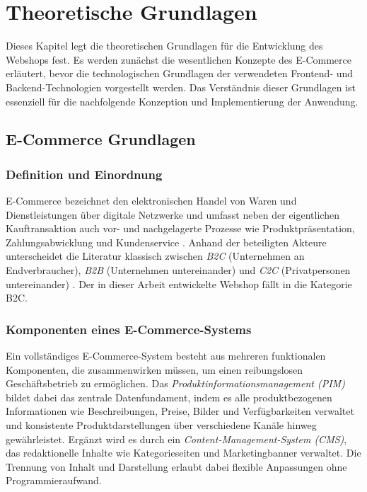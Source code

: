 \chapter{Theoretische Grundlagen}
\label{ch:grundlagen}

Dieses Kapitel legt die theoretischen Grundlagen für die Entwicklung des Webshops fest. Es werden zunächst die wesentlichen Konzepte des E-Commerce erläutert, bevor die technologischen Grundlagen der verwendeten Frontend- und Backend-Technologien vorgestellt werden. Das Verständnis dieser Grundlagen ist essenziell für die nachfolgende Konzeption und Implementierung der Anwendung.

\section{E-Commerce Grundlagen}
\label{sec:ecommerce-grundlagen}

\subsection{Definition und Einordnung}
\label{subsec:ecommerce-definition}

E-Commerce bezeichnet den elektronischen Handel von Waren und Dienstleistungen über digitale Netzwerke und umfasst neben der eigentlichen Kauftransaktion auch vor- und nachgelagerte Prozesse wie Produktpräsentation, Zahlungsabwicklung und Kundenservice \cite{heinemann2024, jain2021}. Anhand der beteiligten Akteure unterscheidet die Literatur klassisch zwischen \textit{B2C} (Unternehmen an Endverbraucher), \textit{B2B} (Unternehmen untereinander) und \textit{C2C} (Privatpersonen untereinander) \cite{jain2021}. Der in dieser Arbeit entwickelte Webshop fällt in die Kategorie B2C.

\subsection{Komponenten eines E-Commerce-Systems}
\label{subsec:ecommerce-komponenten}

Ein vollständiges E-Commerce-System besteht aus mehreren funktionalen Komponenten, die zusammenwirken müssen, um einen reibungslosen Geschäftsbetrieb zu ermöglichen. Das \textit{Produktinformationsmanagement (PIM)} bildet dabei das zentrale Datenfundament, indem es alle produktbezogenen Informationen wie Beschreibungen, Preise, Bilder und Verfügbarkeiten verwaltet und konsistente Produktdarstellungen über verschiedene Kanäle hinweg gewährleistet. Ergänzt wird es durch ein \textit{Content-Management-System (CMS)}, das redaktionelle Inhalte wie Kategorieseiten und Marketingbanner verwaltet. Die Trennung von Inhalt und Darstellung erlaubt dabei flexible Anpassungen ohne Programmieraufwand.

